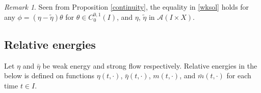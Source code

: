\documentclass[10pt, letterpaper]{article}
\theoremstyle{definition}
\theoremstyle{remark}
\newtheorem{remark}[subsubsection]{Remark}
\begin{document}
\begin{remark} \label{wktest}
 Seen from Proposition \ref{continuity}, the equality in \eqref{wksol} holds for any $\phi=(\eta - \tilde\eta)\theta$ for $\theta\in C_0^{0,1}(I)$, and $\eta$, $\tilde\eta$ in $\mathcal{A}(I\times X)$.%
\end{remark}

\subsection{Relative energies} \label{sec:rel}
Let $\eta$ and $\bar\eta$ be weak energy and strong flow respectively. Relative energies in the below is defined on functions $\eta(t,\cdot)$, $\bar\eta(t,\cdot)$, $m(t,\cdot)$, and $\bar m (t,\cdot)$ for each time $t \in I$.
\end{document}
